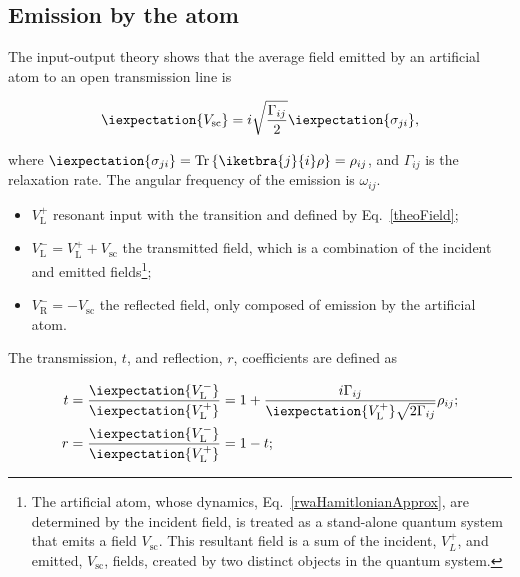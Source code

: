 \subsection{Emission by the atom\label{subsec:Scattering}}
\begin{framed}\noindent
  The input-output  theory shows that  the average field emitted  by an
  artificial atom to an open transmission line is

\begin{equation}\label{theoEmission}
  \iexpectation{V_{\text{sc}}} =  i\sqrt{\frac{\Gamma_{ij}}{2}}\iexpectation{\sigma_{ji}},
\end{equation}
\end{framed}

\noindent                                                         where
$    \iexpectation{\sigma_{ji}}=\text{Tr}\left\lbrace   \iketbra{j}{i}\rho
\right\rbrace   =   \rho_{ij}  $,   and   $   \Gamma_{ij}  $   is   the
\ilra{} relaxation  rate.  The  angular frequency  of the
emission is $ \omega_{ij} $.
\begin{itemize}
\item    $    V_{\text{L}}^{+}    $    resonant    input    with    the
  \ilra{}       transition      and       defined      by
  Eq.~\eqref{theoField};
\item   $   V_{\text{L}}^{-}  =   V_{\text{L}}^{+}+V_{\text{sc}}$   the
  transmitted field, which is a combination of the incident and emitted
  fields\footnote{The     artificial      atom,     whose     dynamics,
    Eq.~\eqref{rwaHamitlonianApprox},  are determined  by the  incident
    field,  is treated  as a  stand-alone quantum  system that  emits a
    field $  V_{\text{sc}} $.   This resultant  field is  a sum  of the
    incident,  $V_{L}^{+} $,  and emitted,  $ V_{\text{sc}}  $, fields,
    created by two distinct objects in the quantum system.};
\item $ V_{\text{R}}^{-}  = - V_{\text{sc}}$ the  reflected field, only
  composed of emission by the artificial atom.
\end{itemize}

The  transmission, $  t  $, and  reflection, $  r  $, coefficients  are
defined as

\begin{equation}\label{theoRefTran}
  \begin{aligned}
    t & = \frac{\iexpectation{V_{\text{L}}^{-}}}{\iexpectation{V_{\text{L}}^{+}}} = 1+\frac{i\Gamma_{ij}}{\iexpectation{V_{\text{L}}^{+}}\sqrt{2\Gamma_{ij}}}\rho_{ij};\\
    r                                &                                =
    \frac{\iexpectation{V_{\text{L}}^{-}}}{\iexpectation{V_{\text{L}}^{+}}}
    = 1-t;
  \end{aligned}
\end{equation}


